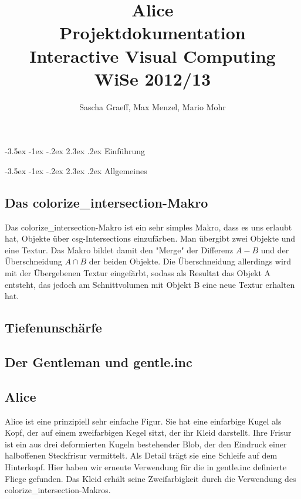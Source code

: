 \documentclass[twocolumn]{article}
\author{Sascha Graeff, Max Menzel, Mario Mohr}
\title{Alice \\ \small Projektdokumentation \\ Interactive Visual Computing \\ WiSe 2012/13}
\makeatletter
\renewcommand\section{\@startsection{section}{1}{\z@}%
                                      {-3.5ex \@plus -1ex \@minus -.2ex}%
                                      {2.3ex \@plus.2ex}%
                                      {\normalfont\large\bfseries}}
\makeatother
\begin{document}
\maketitle



\section{Einführung}

\section{Allgemeines}
\subsection{Das colorize\_intersection-Makro}
Das colorize\_intersection-Makro ist ein sehr simples Makro, dass es uns erlaubt hat, Objekte über csg-Intersections einzufärben.
Man übergibt zwei Objekte und eine Textur. Das Makro bildet damit den "Merge" der Differenz $A - B$ und der Überschneidung $A \cap B$ der beiden Objekte.
Die Überschneidung allerdings wird mit der Übergebenen Textur eingefärbt, sodass als Resultat das Objekt A entsteht, das jedoch am Schnittvolumen mit Objekt B eine neue Textur erhalten hat.

\subsection{Tiefenunschärfe}
\subsection{Der Gentleman und gentle.inc} %

\subsection{Alice}
Alice ist eine prinzipiell sehr einfache Figur. Sie hat eine einfarbige Kugel als Kopf, der auf einem zweifarbigen Kegel sitzt, der ihr Kleid darstellt.
Ihre Frisur ist ein aus drei deformierten Kugeln bestehender Blob, der den Eindruck einer halboffenen Steckfrisur vermittelt.
Als Detail trägt sie eine Schleife auf dem Hinterkopf. Hier haben wir erneute Verwendung für die in gentle.inc definierte Fliege gefunden.
Das Kleid erhält seine Zweifarbigkeit durch die Verwendung des colorize\_intersection-Makros.
\end{document}
